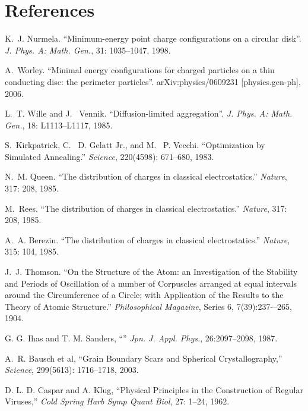 \documentclass[12pt,a4paper,final]{iopart}
\begin{document}
{\clearpage

\section*{References}

\begin{thebibliography}{9999}

\noindent
K.~J. Nurmela.
``Minimum-energy point charge configurations on a circular disk''.
{\em J. Phys. A: Math. Gen.}, 31: 1035--1047, 1998.

\noindent
A.~Worley.
``Minimal energy configurations for charged particles on a thin conducting disc: the perimeter particles''.
arXiv:physics/0609231 [physics.gen-ph], 2006.

\noindent
L.~T. Wille and J. ~Vennik.
``Diffusion-limited aggregation''.
{\em J. Phys. A: Math. Gen.}, 18: L1113--L1117, 1985.

\noindent
S.~Kirkpatrick, C.~ D. Gelatt Jr., and M.~ P. Vecchi.
``Optimization by Simulated Annealing.''
{\em Science}, 220(4598): 671--680, 1983.

\noindent
N.~M. Queen.
``The distribution of charges in classical electrostatics.''
{\em Nature}, 317: 208, 1985.

\noindent
M.~Rees.
``The distribution of charges in classical electrostatics.''
{\em Nature}, 317: 208, 1985.

\noindent
A.~A. Berezin.
``The distribution of charges in classical electrostatics.''
{\em Nature}, 315: 104, 1985.

\noindent
J.~J. Thomson.
``On the Structure of the Atom: an Investigation of the Stability and Periods of Oscillation of a number of Corpuscles arranged at equal intervals around the Circumference of a Circle; with Application of the Results to the Theory of Atomic Structure.'' 
{\em Philosophical Magazine}, Series 6, 7(39):237-–265, 1904.

\noindent
G. G. Ihas and T. M. Sanders,
``''
{\em Jpn. J. Appl. Phys.}, 26:2097--2098, 1987.

\noindent
A.~R. Bausch et al,
``Grain Boundary Scars and Spherical Crystallography,''
{\em Science}, 299(5613): 1716--1718, 2003.

\noindent
D. L. D. Caspar and A. Klug,
``Physical Principles in the Construction of Regular Viruses,''
{\em Cold Spring Harb Symp Quant Biol}, 27: 1--24, 1962.


\end{thebibliography}}
\end{document}
